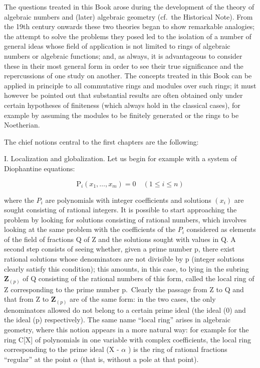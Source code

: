 
The questions treated in this Book arose during the development of the theory of algebraic numbers and (later) algebraic geometry (cf.~the Historical Note). From the 19th century onwards these two theories began to show remarkable analogies; the attempt to solve the problems they posed led to the isolation of a number of general ideas whose field of application is not limited to rings of algebraic numbers or algebraic functions; and, as always, it is advantageous to consider these in their most general form in order to see their true significance and the repercussions of one study on another. The concepts treated in this Book can be applied in principle to all commutative rings and modules over such rings; it must however be pointed out that substantial results are often obtained only under certain hypotheses of finiteness (which always hold in the classical cases), for example by assuming the modules to be finitely generated or the rings to be Noetherian.

The chief notions central to the first chapters are the following:

I. Localization and globalization. Let us begin for example with a system of Diophantine equations:

\[
\mathrm{P} _ {i} (x _ {1}, \dots , x _ {m}) = 0 \quad (1 \leqslant i \leqslant n)\tag{*}
\]

where the \(P_{i}\) are polynomials with integer coefficients and solutions \((x_{i})\) are sought consisting of rational integers. It is possible to start approaching the problem by looking for solutions consisting of rational numbers, which involves looking at the same problem with the coefficients of the \(P_{i}\) considered as elements of the field of fractions Q of Z and the solutions sought with values in Q. A second step consists of seeing whether, given a prime number p, there exist rational solutions whose denominators are not divisible by p (integer solutions clearly satisfy this condition); this amounts, in this case, to lying in the subring \(\mathbf{Z}_{(p)}\) of Q consisting of the rational numbers of this form, called the local ring of Z corresponding to the prime number p.~Clearly the passage from Z to Q and that from Z to \(\mathbf{Z}_{(p)}\) are of the same form: in the two cases, the only denominators allowed do not belong to a certain prime ideal (the ideal (0) and the ideal (p) respectively). The same name ``local ring'' arises in algebraic geometry, where this notion appears in a more natural way: for example for the ring C{[}X{]} of polynomials in one variable with complex coefficients, the local ring corresponding to the prime ideal (X - \(\alpha\) ) is the ring of rational fractions ``regular'' at the point \(\alpha\) (that is, without a pole at that point).

